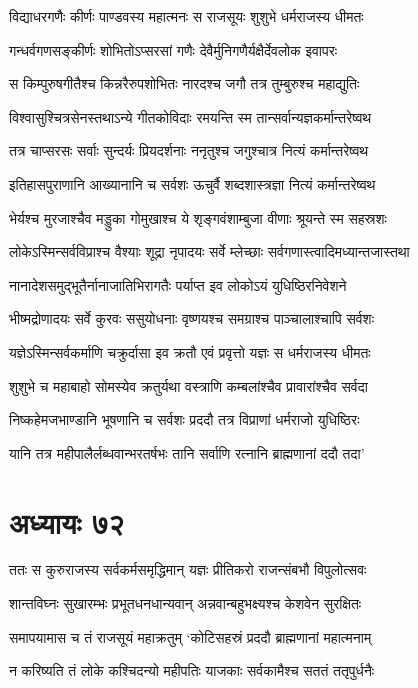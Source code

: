 \twolineshloka
{विद्याधरगणैः कीर्णः पाण्डवस्य महात्मनः}
{स राजसूयः शुशुभे धर्मराजस्य धीमतः}


\twolineshloka
{गन्धर्वगणसङ्कीर्णः शोभितोऽप्सरसां गणैः}
{देवैर्मुनिगणैर्यक्षैर्देवलोक इवापरः}


\twolineshloka
{स किम्पुरुषगीतैश्च किन्नरैरुपशोभितः}
{नारदश्च जगौ तत्र तुम्बुरुश्च महाद्युतिः}


\twolineshloka
{विश्वासुश्चित्रसेनस्तथाऽन्ये गीतकोविदाः}
{रमयन्ति स्म तान्सर्वान्यज्ञकर्मान्तरेष्वथ}


\twolineshloka
{तत्र चाप्सरसः सर्वाः सुन्दर्यः प्रियदर्शनाः}
{ननृतुश्च जगुश्चात्र नित्यं कर्मान्तरेष्वथ}


\twolineshloka
{इतिहासपुराणानि आख्यानानि च सर्वशः}
{ऊचुर्वै शब्दशास्त्रज्ञा नित्यं कर्मान्तरेष्वथ}


\twolineshloka
{भेर्यश्च मुरजाश्चैव मड्डुका गोमुखाश्च ये}
{शृङ्गवंशाम्बुजा वीणाः श्रूयन्ते स्म सहस्रशः}


\threelineshloka
{लोकेऽस्मिन्सर्वविप्राश्च वैश्याः शूद्रा नृपादयः}
{सर्वे म्लेच्छाः सर्वगणास्त्वादिमध्यान्तजास्तथा}
{}


\twolineshloka
{नानादेशसमुद्भूतैर्नानाजातिभिरागतैः}
{पर्याप्त इव लोकोऽयं युधिष्ठिरनिवेशने}


\twolineshloka
{भीष्मद्रोणादयः सर्वे कुरवः ससुयोधनाः}
{वृष्णयश्च समग्राश्च पाञ्चालाश्चापि सर्वशः}


\twolineshloka
{यज्ञेऽस्मिन्सर्वकर्माणि चक्रुर्दासा इव क्रतौ}
{एवं प्रवृत्तो यज्ञः स धर्मराजस्य धीमतः}


\twolineshloka
{शुशुभे च महाबाहो सोमस्येव क्रतुर्यथा}
{वस्त्राणि कम्बलांश्चैव प्रावारांश्चैव सर्वदा}


\twolineshloka
{निष्कहेमजभाण्डानि भूषणानि च सर्वशः}
{प्रददौ तत्र विप्राणां धर्मराजो युधिष्ठिरः}


\twolineshloka
{यानि तत्र महीपालैर्लब्धवान्भरतर्षभः}
{तानि सर्वाणि रत्नानि ब्राह्मणानां ददौ तदा'}


\chapter{अध्यायः ७२}
\twolineshloka
{ततः स कुरुराजस्य सर्वकर्मसमृद्धिमान्}
{यज्ञः प्रीतिकरो राजन्संबभौ विपुलोत्सवः}


\twolineshloka
{शान्तविघ्नः सुखारम्भः प्रभूतधनधान्यवान्}
{अन्नवान्बहुभक्ष्यश्च केशवेन सुरक्षितः}


\twolineshloka
{समापयामास च तं राजसूयं महाक्रतुम्}
{`कोटिसहस्रं प्रददौ ब्राह्मणानां महात्मनाम्}


\twolineshloka
{न करिष्यति तं लोके कश्चिदन्यो महीपतिः}
{याजकाः सर्वकामैश्च सततं ततृपुर्धनैः}


